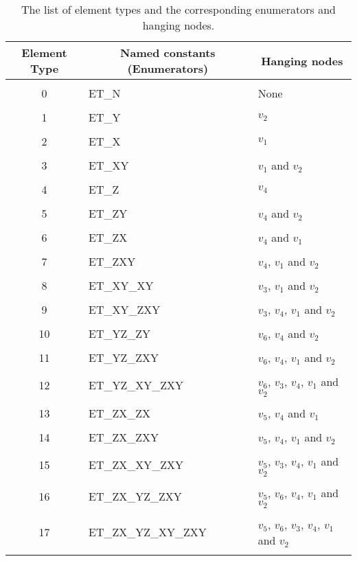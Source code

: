 \documentclass[10pt,reqno,a4paper]{report}
\numberwithin{equation}{section}
\begin{document}
\begin{table}
	\centering
		\begin{tabular}{|c|l|l|}\hline
		\multicolumn{1}{|c}{Element Type} & \multicolumn{1}{|c}{Named constants (Enumerators)} & \multicolumn{1}{|c|}{Hanging nodes}\\\hline
		   & & \\
		 0 &  ET\_N     & None\\
		 & & \\
     1 &  ET\_Y    & $v_2$\\
     & & \\
     2 &  ET\_X    & $v_1$\\
     & & \\
     3 &  ET\_XY   & $v_1$ and $v_2$\\
     & & \\
     4 &  ET\_Z    & $v_4$\\
     & & \\
     5 &  ET\_ZY   & $v_4$ and $v_2$\\
     & & \\
     6 &  ET\_ZX   & $v_4$ and $v_1$\\
     & & \\
     7 &  ET\_ZXY   & $v_4$, $v_1$ and $v_2$\\
     & & \\
     8 &  ET\_XY\_XY   & $v_3$, $v_1$ and $v_2$\\
     & & \\
     9 &  ET\_XY\_ZXY   & $v_3$, $v_4$, $v_1$ and $v_2$\\
     & & \\
     10 & ET\_YZ\_ZY   & $v_6$, $v_4$ and $v_2$\\
     & & \\
     11 & ET\_YZ\_ZXY   & $v_6$, $v_4$, $v_1$ and $v_2$\\
     & & \\
     12 & ET\_YZ\_XY\_ZXY   & $v_6$, $v_3$, $v_4$, $v_1$ and $v_2$ \\
     & & \\
     13 & ET\_ZX\_ZX      & $v_5$, $v_4$ and $v_1$\\
     & & \\
     14 & ET\_ZX\_ZXY     & $v_5$, $v_4$, $v_1$ and $v_2$\\
     & & \\
     15 & ET\_ZX\_XY\_ZXY   & $v_5$, $v_3$, $v_4$, $v_1$ and $v_2$\\
     & & \\
     16 & ET\_ZX\_YZ\_ZXY    & $v_5$, $v_6$, $v_4$, $v_1$ and $v_2$ \\
     & & \\
     17 & ET\_ZX\_YZ\_XY\_ZXY   & $v_5$, $v_6$, $v_3$, $v_4$, $v_1$ and $v_2$ \\
     & & \\\hline     
		\end{tabular}
\caption{The list of element types and the corresponding enumerators and hanging nodes.}
\label{tab:etypes}
\end{table}
\end{document}
